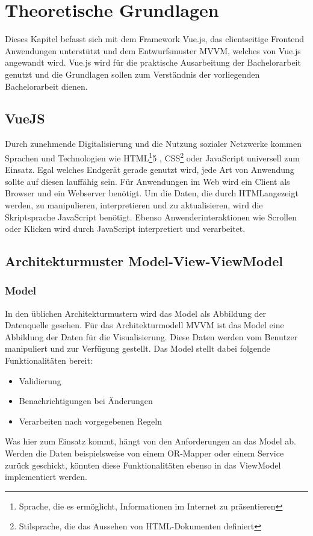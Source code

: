 \chapter{Theoretische Grundlagen}
Dieses Kapitel befasst sich mit dem Framework Vue.js, das clientseitige Frontend Anwendungen unterst\"utzt und dem Entwurfsmuster \ac{MVVM}, welches von Vue.js angewandt wird. Vue.js wird f\"ur die praktische Ausarbeitung der Bachelorarbeit genutzt und die Grundlagen sollen zum Verst\"andnis der vorliegenden Bachelorarbeit dienen.
\section{VueJS}
\label{sec:Vue}
Durch zunehmende Digitalisierung und die Nutzung sozialer Netzwerke kommen Sprachen und Technologien wie \ac{HTML}\footnote{Sprache, die es erm\"oglicht, Informationen im Internet zu pr\"asentieren}5 , \ac{CSS}\footnote{Stilsprache, die das Aussehen von \ac{HTML}-Dokumenten definiert} oder JavaScript universell zum Einsatz. Egal welches Endger\"at gerade genutzt wird, jede Art von Anwendung sollte auf diesen lauff\"ahig sein\cite{Teufel2018}.
F\"ur Anwendungen im Web wird ein Client als Browser und ein Webserver ben\"otigt. Um die Daten, die durch  \ac{HTML}angezeigt werden, zu manipulieren, interpretieren und zu aktualisieren, wird die Skriptsprache JavaScript ben\"otigt\cite{UniHagenWeb}. Ebenso Anwenderinteraktionen wie Scrollen oder Klicken wird durch JavaScript interpretiert und verarbeitet.




\section{Architekturmuster Model-View-ViewModel}
\label{sec:MVVM}

\subsection*{Model}
In  den \"ublichen Architekturmustern wird das Model als Abbildung der Datenquelle gesehen. F\"ur das  Architekturmodell \ac{MVVM} ist das Model eine Abbildung der Daten f\"ur die Visualisierung. Diese Daten werden vom Benutzer manipuliert und zur Verf\"ugung gestellt.
Das Model stellt dabei folgende Funktionalit\"aten bereit:
\begin{itemize}
\item Validierung
\item Benachrichtigungen bei \"Anderungen
\item Verarbeiten nach vorgegebenen Regeln
\end{itemize}
Was hier zum Einsatz kommt, h\"angt von den Anforderungen an das Model ab. Werden die Daten beispielsweise von einem OR-Mapper oder einem Service zur\"uck geschickt, k\"onnten diese Funktionalit\"aten ebenso in das ViewModel implementiert werden\cite{EderModel2017}.

